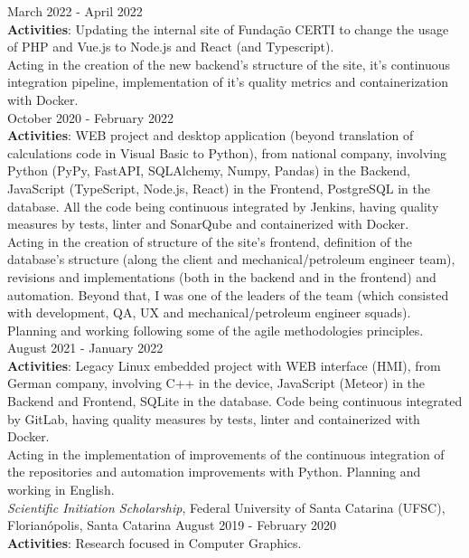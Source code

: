 \documentclass[a4paper,10pt]{article}
\begin{document}
{	    March 2022 - April 2022\\
        \textbf{Activities}: Updating the internal site of Fundação CERTI to change the usage of PHP and Vue.js to Node.js and React (and Typescript).\\

        Acting in the creation of the new backend's structure of the site, it's continuous integration pipeline, implementation of it's quality metrics and containerization with Docker.\\

        October 2020 - February 2022\\
        \textbf{Activities}: WEB project and desktop application (beyond translation of calculations code in Visual Basic to Python), from national company, involving Python (PyPy, FastAPI, SQLAlchemy, Numpy, Pandas) in the Backend, JavaScript (TypeScript, Node.js, React) in the Frontend, PostgreSQL in the database. All the code being continuous integrated by Jenkins, having quality measures by tests, linter and SonarQube and containerized with Docker.\\

        Acting in the creation of structure of the site's frontend, definition of the database's structure (along the client and mechanical/petroleum engineer team), revisions and implementations (both in the backend and in the frontend) and automation. Beyond that, I was one of the leaders of the team (which consisted with development, QA, UX and mechanical/petroleum engineer squads). Planning and working following some of the agile methodologies principles.\\

        August 2021 - January 2022\\
        \textbf{Activities}: Legacy Linux embedded project with WEB interface (HMI), from German company, involving C++ in the device, JavaScript (Meteor) in the Backend and Frontend, SQLite in the database. Code being continuous integrated by GitLab, having quality measures by tests, linter and containerized with Docker.\\

        Acting in the implementation of improvements of the continuous integration of the repositories and automation improvements with Python. Planning and working in English.\\

	    \textit{Scientific Initiation Scholarship}, Federal University of Santa Catarina (UFSC), Florianópolis, Santa Catarina \hfill August 2019 - February 2020 \\
		\textbf{Activities}: Research focused in Computer Graphics.\\

}
\end{document}
